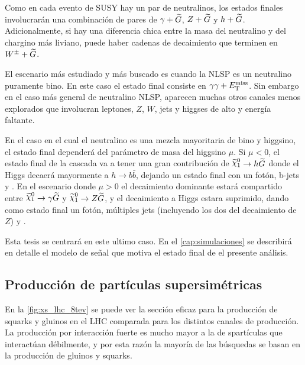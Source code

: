 Como en cada evento de SUSY hay un par de neutralinos, los estados
finales involucrarán una combinación de pares de $\gamma + \widetilde{G}$, $Z +
\widetilde{G}$ y $h + \widetilde{G}$. Adicionalmente, si hay una diferencia chica entre la masa
del neutralino y del chargino más liviano, puede haber cadenas de decaimiento
que terminen en $W^\pm + \widetilde{G}$.

El escenario más estudiado y más buscado es cuando la NLSP es un neutralino
puramente bino. En este caso el estado final consiste en $\gamma\gamma + E_{\mathrm{T}}^{\mathrm{miss}}$.
Sin embargo en el caso más general de neutralino NLSP, aparecen muchas otros
canales menos explorados que involucran leptones, $Z$, $W$, jets y higgses de
alto {\pt} y energía faltante.


En el caso en el cual el neutralino es una mezcla mayoritaria de bino y higgsino, el
estado final dependerá del parámetro de masa del higgsino $\mu$. Si
$\mu <0$, el estado final de la cascada va a tener una gran contribución
de $\ninoone \to h\gravino$ donde el Higgs decaerá mayormente a $h\to b \bar{b}$,
dejando un estado final con un fotón, b-jets y {\met}. En el escenario donde
$\mu>0$ el decaimiento dominante estará compartido entre $\ninoone \to \gam\gravino$
y $\ninoone\to Z \gravino$, y el decaimiento a Higgs estara suprimido,
dando como estado final un fotón, múltiples jets (incluyendo
los dos del decaimiento de $Z$) y {\met}.

Esta tesis se centrará en este ultimo caso. En el \cref{cap:simulaciones}
se describirá en detalle el modelo de se\~nal que motiva el estado final
de el presente análisis.




\subsection{Producción de partículas supersimétricas}

En la \cref{fig:xs_lhc_8tev} se puede ver la sección eficaz para la producción
de squarks y gluinos en el LHC comparada para los distintos canales de
producción. La producción por interacción fuerte es mucho mayor a la de
spartículas que interactúan débilmente, y por esta razón la mayoría de las
búsquedas se basan en la producción de gluinos y squarks.

